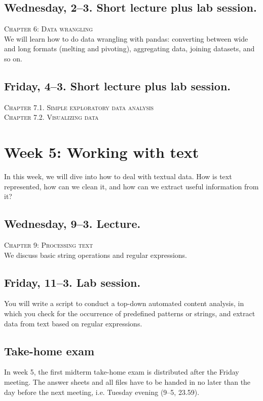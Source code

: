 \subsection*{Wednesday, 2--3. Short lecture plus lab session.}
\textsc{ Chapter 6: Data wrangling}\\
We will learn how to do data wrangling with pandas: converting between wide and long formats (melting and pivoting), aggregating data, joining datasets, and so on.

\subsection*{Friday, 4--3.  Short lecture plus lab session.}
\textsc{ Chapter 7.1. Simple exploratory data analysis}\\
\textsc{ Chapter 7.2. Visualizing data}\\




\section*{Week 5: Working with text}
In this week, we will dive into how to deal with textual data. How is text represented, how can we clean it, and how can we extract useful information from it?

\subsection*{Wednesday, 9--3. Lecture.}
\textsc{ Chapter 9: Processing text}\\
We discuss basic string operations and regular expressions.


\subsection*{Friday, 11--3. Lab session.}
You will write a script to conduct a top-down automated content analysis, in which you check for the occurrence of predefined patterns or strings, and extract data from text based on regular expressions.



\subsection*{Take-home exam}
In week 5, the first midterm take-home exam is distributed after the Friday meeting. The answer sheets and all files have to be handed in no later than the day before the next meeting, i.e. Tuesday evening (9--5, 23.59).




